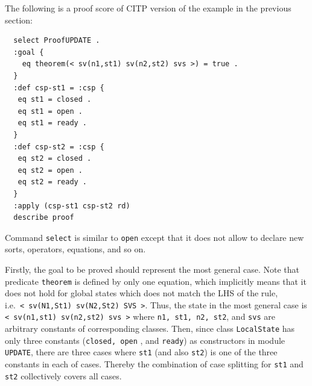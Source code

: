 \documentclass[12pt]{report}
\newcommand{\stt}[1]{{\small{\tt {#1}}}}
\begin{document}
The following is a proof score of CITP version of the example in the previous section:
\small
\begin{verbatim}
  select ProofUPDATE .
  :goal {
    eq theorem(< sv(n1,st1) sv(n2,st2) svs >) = true .
  }
  :def csp-st1 = :csp {
   eq st1 = closed .
   eq st1 = open .
   eq st1 = ready .
  }
  :def csp-st2 = :csp {
   eq st2 = closed .
   eq st2 = open .
   eq st2 = ready .
  }
  :apply (csp-st1 csp-st2 rd)
  describe proof
\end{verbatim}
\normalsize
Command {\tt select} is similar to {\tt open} except that it does not
allow to declare new sorts, operators, equations, and so on. 

Firstly, the goal to be proved should represent the most general case.
Note that predicate {\tt theorem} is defined by only one equation,
which implicitly means that it does not hold for global states which
does not match the LHS of the rule,
i.e.\ \stt{<~sv(N1,St1)~sv(N2,St2)~SVS~>}. Thus, the state in the most
general case is \stt{<~sv(n1,st1)~sv(n2,st2)~svs~>} where \stt{n1,
  st1, n2, st2}, and {\tt svs} are arbitrary constants of
corresponding classes.  Then, since class {\tt LocalState} has only
three constants ({\tt closed, open} , and {\tt ready}) as constructors
in module {\tt UPDATE}, there are three cases where {\tt st1} (and
also {\tt st2}) is one of the three constants in each of cases. Thereby
the combination of case splitting for {\tt st1} and {\tt st2}
collectively covers all cases.
\end{document}

